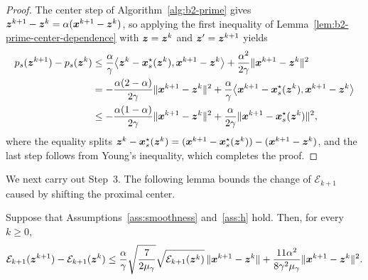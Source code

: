 \begin{proof}
The center step of Algorithm~\ref{alg:b2-prime} gives
\(\bm{z}^{k+1}-\bm{z}^k=\alpha(\bm{x}^{k+1}-\bm{z}^k)\), so applying the first
inequality of Lemma~\ref{lem:b2-prime-center-dependence} with \(\bm{z}=\bm{z}^k\)
and \(\bm{z}'=\bm{z}^{k+1}\) yields
\begin{align*}
    p_s(\bm{z}^{k+1})-p_s(\bm{z}^k)
    &\le\frac{\alpha}{\gamma}\bigl\langle\bm{z}^k-\bm{x}_s^\star(\bm{z}^k),
    \bm{x}^{k+1}-\bm{z}^k\bigr\rangle
    +\frac{\alpha^2}{2\gamma}\|\bm{x}^{k+1}-\bm{z}^k\|^2\\
    &=-\frac{\alpha(2-\alpha)}{2\gamma}\|\bm{x}^{k+1}-\bm{z}^k\|^2
    +\frac{\alpha}{\gamma}\bigl\langle\bm{x}^{k+1}-\bm{x}_s^\star(\bm{z}^k),
    \bm{x}^{k+1}-\bm{z}^k\bigr\rangle\\
    &\le-\frac{\alpha(1-\alpha)}{2\gamma}\|\bm{x}^{k+1}-\bm{z}^k\|^2
    +\frac{\alpha}{2\gamma}\|\bm{x}^{k+1}-\bm{x}_s^\star(\bm{z}^k)\|^2,
\end{align*}
where the equality splits
\(\bm{z}^k-\bm{x}_s^\star(\bm{z}^k)
=(\bm{x}^{k+1}-\bm{x}_s^\star(\bm{z}^k))-(\bm{x}^{k+1}-\bm{z}^k)\), and the last step
follows from Young's inequality, which completes the proof.
\end{proof}

We next carry out Step~3. The following lemma bounds the change of
\(\mathcal E_{k+1}\) caused by shifting the proximal center.

\begin{lemma}
\label{lem:b2-prime-center-error}
Suppose that Assumptions~\ref{ass:smoothness} and~\ref{ass:h} hold. Then,
for every \(k\ge0\),
\[
    \mathcal E_{k+1}(\bm{z}^{k+1})-\mathcal E_{k+1}(\bm{z}^k)
    \le\frac{\alpha}{\gamma}\sqrt{\frac{7}{2\mu_\gamma}}
    \sqrt{\mathcal E_{k+1}(\bm{z}^k)}\,\|\bm{x}^{k+1}-\bm{z}^k\|
    +\frac{11\alpha^2}{8\gamma^2\mu_\gamma}\|\bm{x}^{k+1}-\bm{z}^k\|^2 .
\]
\end{lemma}

